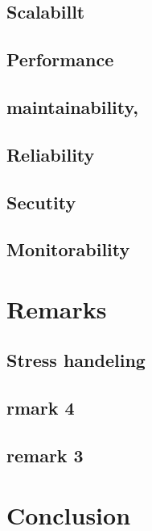 \documentclass[a4paper,12pt,titlepage]{article}
\begin{document}
	\subsection{Scalabillt}
	\subsection{Performance}
	\subsection{maintainability,}
	\subsection{Reliability}
	\subsection{Secutity}
	\subsection{Monitorability}
	
\section{Remarks}
	\subsection{Stress handeling}
	\subsection{rmark 4}
	\subsection{remark 3}

\section{Conclusion}
	
\end{document}
